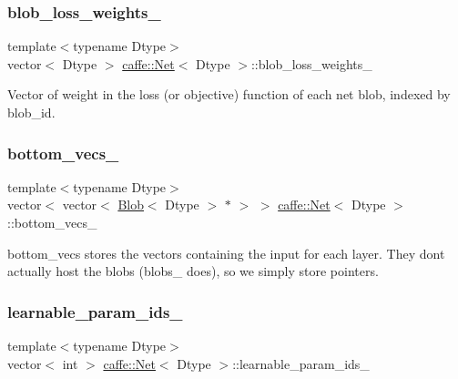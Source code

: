 \subsubsection{\texorpdfstring{blob\+\_\+loss\+\_\+weights\+\_\+}{blob\_loss\_weights\_}}
{\footnotesize\ttfamily template$<$typename Dtype$>$ \\
vector$<$ Dtype $>$ \mbox{\hyperlink{classcaffe_1_1_net}{caffe\+::\+Net}}$<$ Dtype $>$\+::blob\+\_\+loss\+\_\+weights\+\_\+\hspace{0.3cm}{\ttfamily [protected]}}

Vector of weight in the loss (or objective) function of each net blob, indexed by blob\+\_\+id. \mbox{\label{classcaffe_1_1_net_a0fbce4484a2ead09eba35d8e2b18bb41}} 
\subsubsection{\texorpdfstring{bottom\+\_\+vecs\+\_\+}{bottom\_vecs\_}}
{\footnotesize\ttfamily template$<$typename Dtype$>$ \\
vector$<$ vector$<$ \mbox{\hyperlink{classcaffe_1_1_blob}{Blob}}$<$ Dtype $>$ $\ast$ $>$ $>$ \mbox{\hyperlink{classcaffe_1_1_net}{caffe\+::\+Net}}$<$ Dtype $>$\+::bottom\+\_\+vecs\+\_\+\hspace{0.3cm}{\ttfamily [protected]}}

bottom\+\_\+vecs stores the vectors containing the input for each layer. They don\textquotesingle{}t actually host the blobs (blobs\+\_\+ does), so we simply store pointers. \mbox{\label{classcaffe_1_1_net_afcc09ba945873fe3ced73e9cdbec2118}} 
\subsubsection{\texorpdfstring{learnable\+\_\+param\+\_\+ids\+\_\+}{learnable\_param\_ids\_}}
{\footnotesize\ttfamily template$<$typename Dtype$>$ \\
vector$<$ int $>$ \mbox{\hyperlink{classcaffe_1_1_net}{caffe\+::\+Net}}$<$ Dtype $>$\+::learnable\+\_\+param\+\_\+ids\+\_\+\hspace{0.3cm}{\ttfamily [protected]}}

